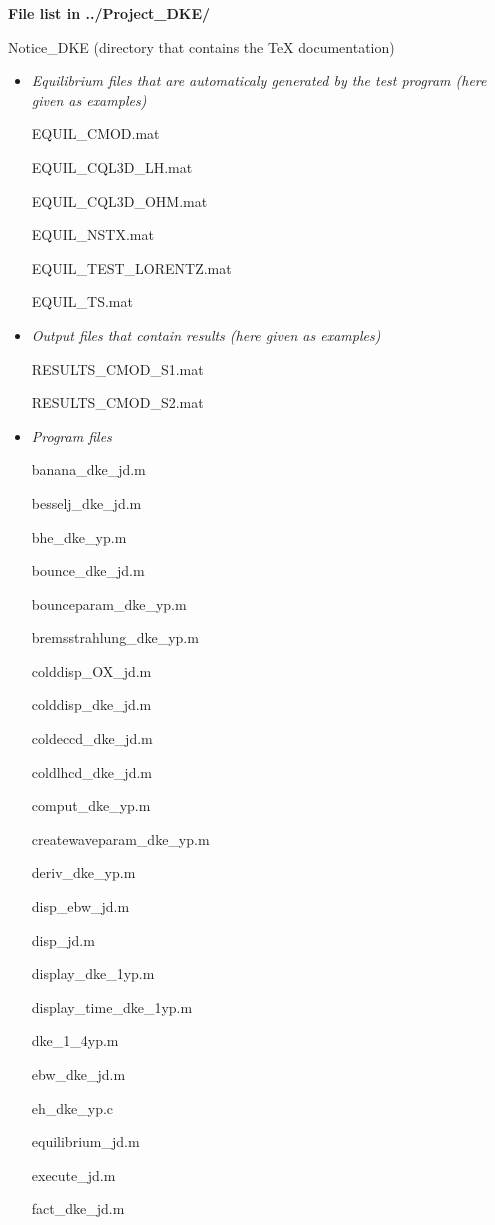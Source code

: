 
\label{listfiles}\textbf{File list in ../Project\_DKE/}

Notice\_DKE (directory that contains the TeX documentation)
\begin{itemize}
\item\textit{Equilibrium files that are automaticaly generated by the test
program (here given as examples)%
}

EQUIL\_CMOD.mat

EQUIL\_CQL3D\_LH.mat

EQUIL\_CQL3D\_OHM.mat

EQUIL\_NSTX.mat

EQUIL\_TEST\_LORENTZ.mat

EQUIL\_TS.mat

\item\textit{Output files that contain results (here given as examples)}

RESULTS\_CMOD\_S1.mat

RESULTS\_CMOD\_S2.mat

\item\textit{Program files}

banana\_dke\_jd.m

besselj\_dke\_jd.m

bhe\_dke\_yp.m

bounce\_dke\_jd.m

bounceparam\_dke\_yp.m

bremsstrahlung\_dke\_yp.m

colddisp\_OX\_jd.m

colddisp\_dke\_jd.m

coldeccd\_dke\_jd.m

coldlhcd\_dke\_jd.m

comput\_dke\_yp.m

createwaveparam\_dke\_yp.m

deriv\_dke\_yp.m

disp\_ebw\_jd.m

disp\_jd.m

display\_dke\_1yp.m

display\_time\_dke\_1yp.m

dke\_1\_4yp.m

ebw\_dke\_jd.m

eh\_dke\_yp.c

equilibrium\_jd.m

execute\_jd.m

fact\_dke\_jd.m


\end{itemize}
